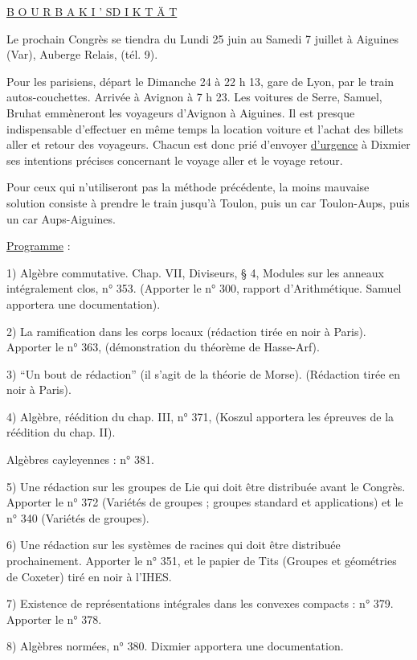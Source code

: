\begin{center}\uline{B O U R B A K I ' S\quad D I K T Ä T}\end{center}

Le prochain Congrès se tiendra du Lundi 25 juin au Samedi 7 juillet à Aiguines (Var), Auberge Relais, (tél. 9).

Pour les parisiens, départ le Dimanche 24 à 22 h 13, gare de Lyon, par le train autos-couchettes. Arrivée à Avignon à 7 h 23. Les voitures de Serre, Samuel, Bruhat emmèneront les voyageurs d'Avignon à Aiguines. Il est presque indispensable d'effectuer en même temps la location voiture et l'achat des billets aller et retour des voyageurs. Chacun est donc prié d'envoyer \uline{d'urgence} à Dixmier ses intentions précises concernant le voyage aller et le voyage retour.

Pour ceux qui n'utiliseront pas la méthode précédente, la moins mauvaise solution consiste à prendre le train jusqu'à Toulon, puis un car Toulon-Aups, puis un car Aups-Aiguines.

\uline{Programme} :

1) Algèbre commutative. Chap. VII, Diviseurs, § 4, Modules sur les anneaux intégralement clos, n° 353. (Apporter le n° 300, rapport d'Arithmétique. Samuel apportera une documentation).

2) La ramification dans les corps locaux (rédaction tirée en noir à Paris). Apporter le n° 363, (démonstration du théorème de Hasse-Arf).

3) ``Un bout de rédaction'' (il s'agit de la théorie de Morse). (Rédaction tirée en noir à Paris).

4) Algèbre, réédition du chap. III, n° 371, (Koszul apportera les épreuves de la réédition du chap. II).

Algèbres cayleyennes : n° 381.

5) Une rédaction sur les groupes de Lie qui doit être distribuée avant le Congrès. Apporter le n° 372 (Variétés de groupes ; groupes standard et applications) et le n° 340 (Variétés de groupes).

6) Une rédaction sur les systèmes de racines qui doit être distribuée prochainement. Apporter le n° 351, et le papier de Tits (Groupes et géométries de Coxeter) tiré en noir à l'IHES.

7) Existence de représentations intégrales dans les convexes compacts : n° 379. Apporter le n° 378.

8) Algèbres normées, n° 380. Dixmier apportera une documentation.

